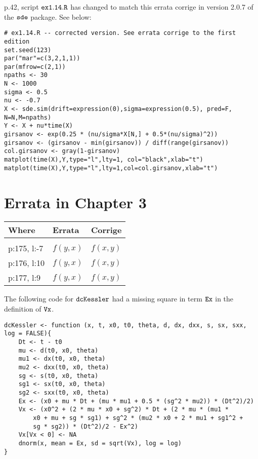 \documentclass[11pt]{article}
\begin{document}
p.42, script ${\tt ex1.14.R}$ has changed to match this errata corrige in version 2.0.7 of the $\tt sde$ package. See below:
\vspace{-0.5cm}
{\scriptsize
\begin{verbatim}
# ex1.14.R -- corrected version. See errata corrige to the first edition
set.seed(123)
par("mar"=c(3,2,1,1))
par(mfrow=c(2,1))
npaths <- 30
N <- 1000
sigma <- 0.5
nu <- -0.7
X <- sde.sim(drift=expression(0),sigma=expression(0.5), pred=F, N=N,M=npaths) 
Y <- X + nu*time(X)
girsanov <- exp(0.25 * (nu/sigma*X[N,] + 0.5*(nu/sigma)^2))
girsanov <- (girsanov - min(girsanov)) / diff(range(girsanov))
col.girsanov <- gray(1-girsanov)
matplot(time(X),Y,type="l",lty=1, col="black",xlab="t")
matplot(time(X),Y,type="l",lty=1,col=col.girsanov,xlab="t")
\end{verbatim}
}

\section*{Errata in Chapter 3}

\begin{tabular}{lll}
Where & Errata & Corrige\\
\hline
\\
p:175, l:-7 &  $f(y,x)$ & $f(x,y)$\\
p:176, l:10  & $f(y,x)$ & $f(x,y)$\\
p:177, l:9  & $f(y,x)$ & $f(x,y)$\\
\end{tabular}
\par
The following code for $\tt dcKessler$ had a missing square in term $\tt Ex$ in the definition of $\tt Vx$.
\vspace{-0.5cm}
{\scriptsize
\begin{verbatim}
dcKessler <- function (x, t, x0, t0, theta, d, dx, dxx, s, sx, sxx, log = FALSE){
    Dt <- t - t0
    mu <- d(t0, x0, theta)
    mu1 <- dx(t0, x0, theta)
    mu2 <- dxx(t0, x0, theta)
    sg <- s(t0, x0, theta)
    sg1 <- sx(t0, x0, theta)
    sg2 <- sxx(t0, x0, theta)
    Ex <- (x0 + mu * Dt + (mu * mu1 + 0.5 * (sg^2 * mu2)) * (Dt^2)/2)
    Vx <- (x0^2 + (2 * mu * x0 + sg^2) * Dt + (2 * mu * (mu1 * 
        x0 + mu + sg * sg1) + sg^2 * (mu2 * x0 + 2 * mu1 + sg1^2 + 
        sg * sg2)) * (Dt^2)/2 - Ex^2)
    Vx[Vx < 0] <- NA
    dnorm(x, mean = Ex, sd = sqrt(Vx), log = log)
}
\end{verbatim}
}
\end{document}
